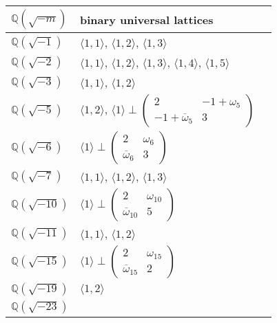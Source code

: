 \documentclass[a4paper,10pt,reqno]{amsart}
\begin{document}
\begin{table}[p]
\begin{tabular}{lll} \hline
${\mathbb{Q}(\sqrt{{-m}})}$          & binary universal lattices \\ \hline{\rule{0pt}{3ex}}${\mathbb{Q}(\sqrt{{-1}})}$  & ${\langle {1,1} \rangle}$, ${\langle {1,2} \rangle}$, ${\langle {1,3} \rangle}$ \\
{\rule{0pt}{3ex}}${\mathbb{Q}(\sqrt{{-2}})}$  & ${\langle {1,1} \rangle}$, ${\langle {1,2} \rangle}$, ${\langle {1,3} \rangle}$, ${\langle {1,4} \rangle}$, ${\langle {1,5} \rangle}$ \\
{\rule{0pt}{3ex}}${\mathbb{Q}(\sqrt{{-3}})}$  & ${\langle {1,1} \rangle}$, ${\langle {1,2} \rangle}$ \\
{\rule{0pt}{3ex}}${\mathbb{Q}(\sqrt{{-5}})}$  & ${\langle {1,2} \rangle}$, ${\langle {1} \rangle}\perp{\begin{pmatrix}
  {2} & {-1+\omega_{5}} \\
  {-1+{{{\overline{\omega}}}}_{5}} & 3
\end{pmatrix}}$ \\
{\rule{0pt}{3ex}}${\mathbb{Q}(\sqrt{{-6}})}$  & ${\langle {1} \rangle}\perp{\begin{pmatrix}
  {2} & {\omega_6} \\
  {{{{\overline{\omega}}}}_6} & 3
\end{pmatrix}}$ \\
{\rule{0pt}{3ex}}${\mathbb{Q}(\sqrt{{-7}})}$  & ${\langle {1,1} \rangle}$, ${\langle {1,2} \rangle}$, ${\langle {1,3} \rangle}$ \\
{\rule{0pt}{3ex}}${\mathbb{Q}(\sqrt{{-10}})}$ & ${\langle {1} \rangle}\perp{\begin{pmatrix}
  {2} & {\omega_{10}} \\
  {{{{\overline{\omega}}}}_{10}} & 5
\end{pmatrix}}$ \\
{\rule{0pt}{3ex}}${\mathbb{Q}(\sqrt{{-11}})}$ & ${\langle {1,1} \rangle}$, ${\langle {1,2} \rangle}$ \\
{\rule{0pt}{3ex}}${\mathbb{Q}(\sqrt{{-15}})}$ & ${\langle {1} \rangle}\perp{\begin{pmatrix}
  {2} & {\omega_{15}} \\
  {{{{\overline{\omega}}}}_{15}} & 2
\end{pmatrix}}$ \\
{\rule{0pt}{3ex}}${\mathbb{Q}(\sqrt{{-19}})}$ & ${\langle {1,2} \rangle}$ \\
{\rule{0pt}{3ex}}${\mathbb{Q}(\sqrt{{-23}})}$ &

\end{tabular}
\end{table}
\end{document}
